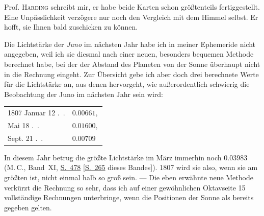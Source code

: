 \par\indent Prof. \textsc{Harding} schreibt mir, er habe beide Karten schon größtenteils fertiggestellt. Eine Unpässlichkeit verzögere nur noch den Vergleich mit dem Himmel selbst. Er hofft, sie Ihnen bald zuschicken zu können.

\par\indent Die Lichtstärke der \emph{Juno} im nächsten Jahr habe ich in meiner Ephemeride nicht angegeben, weil ich sie diesmal nach einer neuen, besonders bequemen Methode berechnet habe, bei der der Abstand des Planeten von der Sonne überhaupt nicht in die Rechnung eingeht. Zur Übersicht gebe ich aber doch drei berechnete Werte für die Lichtstärke an, aus denen hervorgeht, wie außerordentlich schwierig die Beobachtung der Juno im nächsten Jahr sein wird:

\begin{center}\begingroup
\fontsize{9}{11}\selectfont
\setlength{\tabcolsep}{3pt}\renewcommand{\arraystretch}{1.12}
\begin{tabular}{ll}
1807 Januar 12 .\ . & $0.00661,$ \\
Mai 18 .\ . & $0.01600,$ \\
Sept. 21 .\ . & $0.00709$ \\
\end{tabular}\endgroup\end{center}

\par\indent In diesem Jahr betrug die größte Lichtstärke im März immerhin noch $0.03983$ (M.\,C., Band~XI, \href{https://www.digitale-sammlungen.de/en/view/bsb10538603?page=492}{S.~478} [\hyperlink{native-270}{S.~265} dieses Bandes]). 1807 wird sie also, wenn sie am größten ist, nicht einmal halb so groß sein. --- Die eben erwähnte neue Methode verkürzt die Rechnung so sehr, dass ich auf einer gewöhnlichen Oktavseite 15 vollständige Rechnungen unterbringe, wenn die Positionen der Sonne als bereits gegeben gelten.

\par{}

